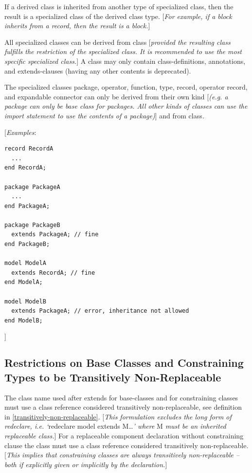 \documentclass[10pt,a4paper]{report}
\def\doublelabel#1{\label{#1}\hypertarget{#1}{}}
\begin{document}
If a derived class is inherited from another type of specialized class,
then the result is a specialized class of the derived class type.
{[}\emph{For example, if a block inherits from a record, then the result
is a block.}{]}

All specialized classes can be derived from class {[}\emph{provided the
resulting class fulfills the restriction of the specialized class. It is
recommended to use the most specific specialized class.}{]} A class may
only contain class-definitions, annotations, and extends-clauses (having
any other contents is deprecated).

The specialized classes package, operator, function, type, record,
operator record, and expandable connector can only be derived from their
own kind {[}\emph{(e.g. a package can only be base class for packages.
All other kinds of classes can use the import statement to use the
contents of a package)}{]} and from class\emph{.}

{[}\emph{Examples}:
\begin{lstlisting}[language=modelica]
record RecordA
  ...
end RecordA;

package PackageA
  ...
end PackageA;

package PackageB
  extends PackageA; // fine
end PackageB;

model ModelA
  extends RecordA; // fine
end ModelA;

model ModelB
  extends PackageA; // error, inheritance not allowed
end ModelB;
\end{lstlisting}
{]}

\subsection{Restrictions on Base Classes and Constraining Types to be Transitively Non-Replaceable}\doublelabel{restrictions-on-base-classes-and-constraining-types-to-be-transitively-non-replaceable}

The class name used after extends for base-classes and for constraining
classes must use a class reference considered transitively
non-replaceable, see definition in \ref{transitively-non-replaceable}. {[}\emph{This
formulation excludes the long form of redeclare, i.e. `}redeclare model
extends M\ldots{}\emph{' where} M \emph{must be an inherited replaceable
class.}{]} For a replaceable component declaration without constraining
clause the class must use a class reference considered transitively
non-replaceable. {[}\emph{This implies that constraining classes are
always transitively non-replaceable -- both if explicitly given or
implicitly by the declaration.}{]}
\end{document}
